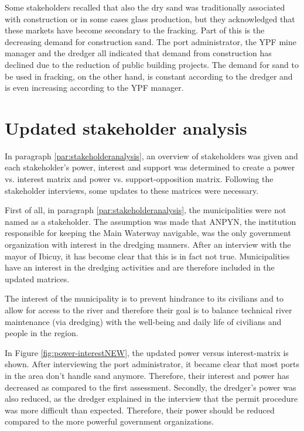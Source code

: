 Some stakeholders recalled that also the dry sand was traditionally associated with construction or in some cases glass production, but they acknowledged that these markets have become secondary to the fracking. Part of this is the decreasing demand for construction sand. The port administrator, the YPF mine manager and the dredger all indicated that demand from construction has declined due to the reduction of public building projects. The demand for sand to be used in fracking, on the other hand, is constant according to the dredger and is even increasing according to the YPF manager.

\section{Updated stakeholder analysis}
In paragraph \ref{par:stakeholderanalysis}, an overview of stakeholders was given and each stakeholder's power, interest and support was determined to create a power vs. interest matrix and power vs. support-opposition matrix. Following the stakeholder interviews, some updates to these matrices were necessary.

First of all, in paragraph \ref{par:stakeholderanalysis}, the municipalities were not named as a stakeholder. The assumption was made that ANPYN, the institution responsible for keeping the Main Waterway navigable, was the only government organization with interest in the dredging manners. After an interview with the mayor of Ibicuy, it has become clear that this is in fact not true. Municipalities have an interest in the dredging activities and are therefore included in the updated matrices.

The interest of the municipality is to prevent hindrance to its civilians and to allow for access to the river and therefore their goal is to balance technical river maintenance (via dredging) with the well-being and daily life of civilians and people in the region.

In Figure \ref{fig:power-interestNEW}, the updated power versus interest-matrix is shown. After interviewing the port administrator, it became clear that most ports in the area don't handle sand anymore. Therefore, their interest and power has decreased as compared to the first assessment. Secondly, the dredger's power was also reduced, as the dredger explained in the interview that the permit procedure was more difficult than expected. Therefore, their power should be reduced compared to the more powerful government organizations.

